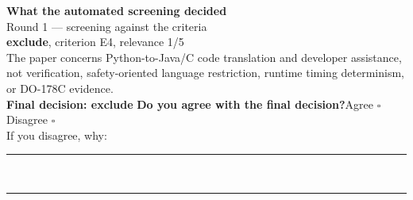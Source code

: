 \documentclass[11pt,a4paper]{article}
\begin{document}
\vspace{3mm}
\vspace{2.5mm}
{\small\textbf{What the automated screening decided}}\\[2mm]
{\footnotesize\color{soft}Round 1 --- screening against the criteria}\\[0.5mm]
{\small\textbf{exclude}, criterion E4, relevance 1/5}\\[0.5mm]
{\small The paper concerns Python-to-Java/C code translation and developer assistance, not verification, safety-oriented language restriction, runtime timing determinism, or DO-178C evidence.}\\[2.5mm]
{\small\textbf{Final decision: exclude}}
\vspace{2mm}
{\small\textbf{Do you agree with the final decision?}\quad{}Agree $\square$\qquad{}Disagree $\square$}\\[1mm]
{\footnotesize\color{soft}If you disagree, why:}\\[1mm]
\color{rule}\rule{\linewidth}{0.3pt}\\[3mm]\rule{\linewidth}{0.3pt}\color{black}
\clearpage
\end{document}
